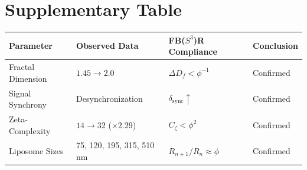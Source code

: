 \documentclass[12pt]{article}
\begin{document}
\section*{Supplementary Table}

\begin{table}[h]
\centering
\begin{tabular}{llll}
\toprule
Parameter & Observed Data & FB($S^3$)R Compliance & Conclusion \\
\midrule
Fractal Dimension & $1.45 \to 2.0$ & $\Delta D_f < \phi^{-1}$ & Confirmed \\
Signal Synchrony & Desynchronization & $\delta_{\mathrm{sync}} \uparrow$ & Confirmed \\
Zeta-Complexity & $14 \to 32$ ($\times 2.29$) & $C_{\zeta} < \phi^2$ & Confirmed \\
Liposome Sizes & 75, 120, 195, 315, 510 nm & $R_{n+1}/R_n \approx \phi$ & Confirmed \\
\bottomrule
\end{tabular}
\end{table}
\end{document}
